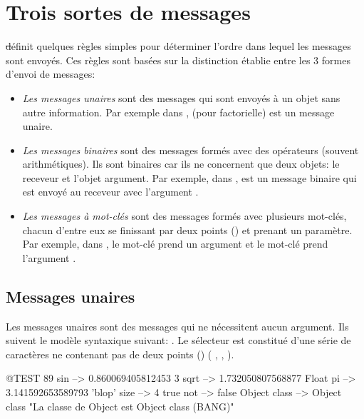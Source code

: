 \documentclass[a4paper,10pt,twoside]{book}
\begin{document}
\section{Trois sortes de messages}

\st d\'efinit quelques r\`egles simples pour d\'eterminer l'ordre dans lequel les messages sont envoy\'es. Ces r\`egles sont bas\'ees sur la distinction \'etablie entre les 3 formes d'envoi de messages: 
\begin{itemize}
\item \emph{Les messages unaires} sont des messages qui sont envoy\'es
  \`a un objet sans autre information. Par exemple dans ,  (pour factorielle) est un message unaire. 
\item  \emph{Les messages binaires} sont des messages form\'es avec
  des op\'erateurs (souvent arithm\'etiques). Ils sont binaires car
  ils ne concernent que deux objets: le receveur et l'objet
  argument. Par exemple, dans , \ct{+} est un message
  binaire qui est envoy\'e au receveur  avec l'argument . 
\item  \emph{Les messages \`a mot-cl\'es} sont des messages form\'es avec plusieurs mot-cl\'es, chacun d'entre eux se finissant par deux points (\ct{:}) et prenant un param\`etre.
Par exemple, dans , le mot-cl\'e 
prend un argument  et le mot-cl\'e  prend l'argument .
\end{itemize}

\subsection{Messages unaires}
Les messages unaires sont des messages qui ne n\'ecessitent aucun
argument. Ils suivent le mod\`ele syntaxique suivant: . Le s\'electeur est constitu\'e d'une s\'erie de
caract\`eres ne contenant pas de deux points (\ct{:}) (\eg
{}, , ).
\begin{code}{@TEST}
89 sin           --> 0.860069405812453
3 sqrt           --> 1.732050807568877
Float pi         --> 3.141592653589793
'blop' size     --> 4
true not        --> false
Object class --> Object class  "La classe de Object est Object class (BANG)"
\end{code}
\end{document}
